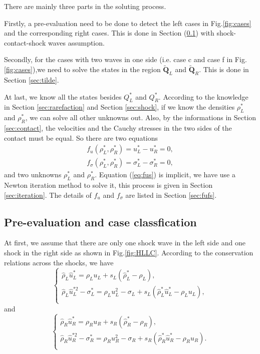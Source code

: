 \documentclass[review]{elsarticle}
\begin{document}
There are mainly three parts in the soluting process. 

Firstly, a pre-evaluation need to  be done to detect the left cases in Fig.\ref{fig:cases} and the corresponding right cases. This is done in Section (\ref{sec:eva}) with shock-contact-shock waves assumption.  

Secondly, for the cases with two waves in one side (i.e.  case c and case f in Fig.\ref{fig:cases}),we need to  solve  the states in the region $\tilde{\mathbf{Q}}_L$ and $\tilde{\mathbf{Q}}_R$. This is done in Section \ref{sec:tilde}.

At last,   we know all  the states besides $Q^*_L$ and $Q^*_R$. According to the knowledge in Section \ref{sec:rarefaction} and Section \ref{sec:shock}, if we  know the densities $\rho^*_L$ and $\rho^*_R$, we can solve all other unknowns out.
Also, by the informations in Section \ref{sec:contact}, the velocities and the Cauchy stresses  in the two sides of the contact must be equal. So there are two equations 
\begin{equation}\label{eq:fus}
  \begin{align}
	f_u(\rho^*_L,\rho^*_R) = u_L^* -u_R^* = 0,\\
	f_\sigma(\rho^*_L,\rho^*_R) = \sigma_L^* -\sigma_R^* = 0,
\end{align}
\end{equation}
and two unknowns $\rho_L^*$ and $\rho_R^*$. Equation (\ref{eq:fus}) is implicit, we have use a Newton iteration method to solve it, this process is given in Section \ref{sec:iteration}. The details of $f_u$ and $f_\sigma$ are listed in Section \ref{sec:fufs}.
\subsection{Pre-evaluation and case classfication}\label{sec:eva}
At first, we assume that there are only one shock wave in the left side and one shock in the right side as shown in Fig.\ref{fig:HLLC}. According to the conservation relations across the shocks, we have    
\begin{equation}
  \left\{
  \begin{align}
	\hat{\rho}_L\hat{u}^*_L = \rho_L u_L +s_L(\hat{\rho}_L^*-\rho_L), \\
	\hat{\rho}_L\hat{u}_L^{*2}-\sigma_L^* = \rho_L u_L^2 -\sigma_L +s_L(\hat{\rho}_L^* \hat{u}_L^*-\rho_L u_L), \\
  \end{align}
\right.
\end{equation}
and
\begin{equation}
  \left\{
  \begin{align}
	\hat{\rho}_R\hat{u}^*_R = \rho_R u_R +s_R(\hat{\rho}_R^*-\rho_R), \\
	\hat{\rho}_R\hat{u}_R^{*2}-\sigma_R^* = \rho_R u_R^2 -\sigma_R +s_R(\hat{\rho}_R^* \hat{u}_R^*-\rho_R u_R). \\
  \end{align}
\right.
\end{equation}
\end{document}
